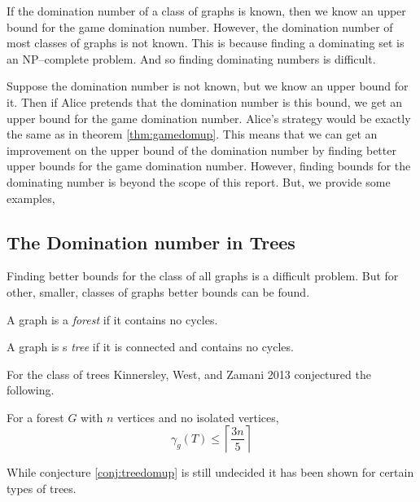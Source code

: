 If the domination number of a class of graphs is known, then we know an upper bound for the game domination number. However, the domination number of most classes of graphs is not known. This is because finding a dominating set is an NP--complete problem. And so finding dominating numbers is difficult.

Suppose the domination number is not known, but we know an upper bound for it. Then if Alice pretends that the domination number is this bound, we get an upper bound for the game domination number. Alice's strategy would be exactly the same as in theorem \ref{thm:gamedomup}. This means that we can get an improvement on the upper bound of the domination number by finding  better upper bounds for the game domination number. However, finding bounds for the dominating number is beyond the scope of this report. But, we provide some examples,


\subsection{The Domination number in Trees}
Finding better bounds for the class of all graphs is a difficult problem. But for other, smaller, classes of graphs better bounds can be found. 
\begin{definition}[Forest]
    A graph is a \textit{forest} if it contains no cycles. 
\end{definition}
\begin{definition}[Tree]
    A graph is s \textit{tree} if it is connected and contains no cycles.
\end{definition}
For the class of trees Kinnersley, West, and Zamani 2013 \cite{KiWeZa2013} conjectured the following. 
\begin{conjecture} \label{conj:treedomup}
    For a forest $G$ with $n$ vertices and no isolated vertices,    
    \[ \gamma_g(T) \leq \left\lceil \frac{3n}{5} \right\rceil\]
\end{conjecture}
While conjecture \ref{conj:treedomup} is still undecided it has been shown for certain types of trees. 


